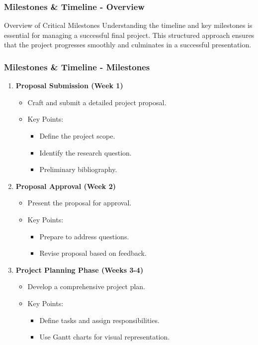 \documentclass[aspectratio=169]{beamer}
\begin{document}
\begin{frame}[fragile]
    \frametitle{Milestones \& Timeline - Overview}
    \begin{block}{Overview of Critical Milestones}
        Understanding the timeline and key milestones is essential for managing a successful final project. 
        This structured approach ensures that the project progresses smoothly and culminates in a successful presentation.
    \end{block}
\end{frame}

\begin{frame}[fragile]
    \frametitle{Milestones \& Timeline - Milestones}
    \begin{enumerate}
        \item \textbf{Proposal Submission (Week 1)}
        \begin{itemize}
            \item Craft and submit a detailed project proposal.
            \item Key Points:
            \begin{itemize}
                \item Define the project scope.
                \item Identify the research question.
                \item Preliminary bibliography.
            \end{itemize}
        \end{itemize}
        
        \item \textbf{Proposal Approval (Week 2)}
        \begin{itemize}
            \item Present the proposal for approval.
            \item Key Points:
            \begin{itemize}
                \item Prepare to address questions.
                \item Revise proposal based on feedback.
            \end{itemize}
        \end{itemize}

        \item \textbf{Project Planning Phase (Weeks 3-4)}
        \begin{itemize}
            \item Develop a comprehensive project plan.
            \item Key Points:
            \begin{itemize}
                \item Define tasks and assign responsibilities.
                \item Use Gantt charts for visual representation.
            \end{itemize}
        \end{itemize}
    \end{enumerate}
\end{frame}
\end{document}
